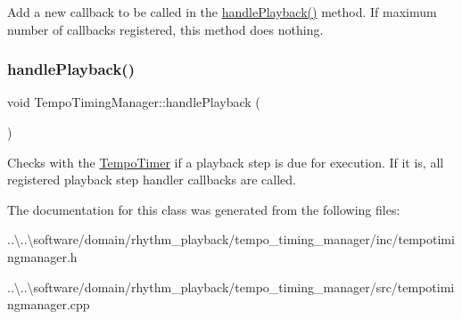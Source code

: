 Add a new callback to be called in the \mbox{\hyperlink{class_tempo_timing_manager_a697545e7fa499a13630d2f224eac4fac}{handle\+Playback()}} method. If maximum number of callbacks registered, this method does nothing. \mbox{\label{class_tempo_timing_manager_a697545e7fa499a13630d2f224eac4fac}} 
\subsubsection{\texorpdfstring{handle\+Playback()}{handlePlayback()}}
{\footnotesize\ttfamily void Tempo\+Timing\+Manager\+::handle\+Playback (\begin{DoxyParamCaption}{ }\end{DoxyParamCaption})}

Checks with the \mbox{\hyperlink{class_tempo_timer}{Tempo\+Timer}} if a playback step is due for execution. If it is, all registered playback step handler callbacks are called. 

The documentation for this class was generated from the following files\+:\begin{DoxyCompactItemize}
\item 
..\textbackslash{}..\textbackslash{}software/domain/rhythm\+\_\+playback/tempo\+\_\+timing\+\_\+manager/inc/tempotimingmanager.\+h\item 
..\textbackslash{}..\textbackslash{}software/domain/rhythm\+\_\+playback/tempo\+\_\+timing\+\_\+manager/src/tempotimingmanager.\+cpp\end{DoxyCompactItemize}
